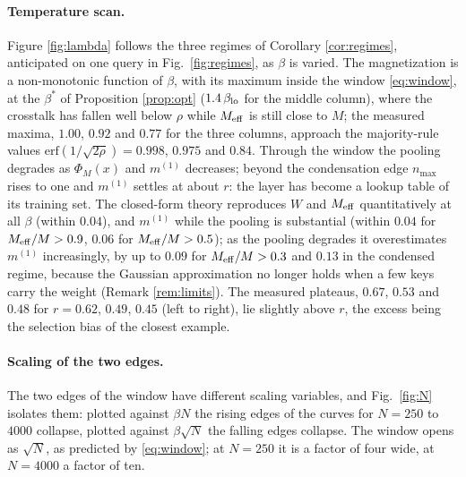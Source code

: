 \documentclass{SciPost}
\theoremstyle{plain}
\theoremstyle{definition}
\newcommand{\Meff}{M_{\rm eff}}
\newcommand{\erf}{\mathrm{erf}}
\begin{document}
\paragraph{Temperature scan.} Figure \ref{fig:lambda} follows the three regimes of Corollary \ref{cor:regimes}, anticipated on one query in Fig.\ \ref{fig:regimes}, as $\beta$ is varied. The magnetization is a non-monotonic function of $\beta$, with its maximum inside the window \eqref{eq:window}, at the $\beta^*$ of Proposition \ref{prop:opt} ($1.4\,\beta_{\rm lo}$ for the middle column), where the crosstalk has fallen well below $\rho$ while $\Meff$ is still close to $M$; the measured maxima, $1.00$, $0.92$ and $0.77$ for the three columns, approach the majority-rule values $\erf(1/\sqrt{2\rho})=0.998$, $0.975$ and $0.84$. Through the window the pooling degrades as $\Phi_M(x)$ and $m^{(1)}$ decreases; beyond the condensation edge $n_{\max}$ rises to one and $m^{(1)}$ settles at about $r$: the layer has become a lookup table of its training set. The closed-form theory reproduces $W$ and $\Meff$ quantitatively at all $\beta$ (within $0.04$), and $m^{(1)}$ while the pooling is substantial (within $0.04$ for $\Meff/M>0.9$, $0.06$ for $\Meff/M>0.5$); as the pooling degrades it overestimates $m^{(1)}$ increasingly, by up to $0.09$ for $\Meff/M>0.3$ and $0.13$ in the condensed regime, because the Gaussian approximation no longer holds when a few keys carry the weight (Remark \ref{rem:limits}). The measured plateaus, $0.67$, $0.53$ and $0.48$ for $r=0.62$, $0.49$, $0.45$ (left to right), lie slightly above $r$, the excess being the selection bias of the closest example.

\paragraph{Scaling of the two edges.} The two edges of the window have different scaling variables, and Fig.\ \ref{fig:N} isolates them: plotted against $\beta N$ the rising edges of the curves for $N=250$ to $4000$ collapse, plotted against $\beta\sqrt N$ the falling edges collapse. The window opens as $\sqrt N$, as predicted by \eqref{eq:window}; at $N=250$ it is a factor of four wide, at $N=4000$ a factor of ten.
\end{document}
